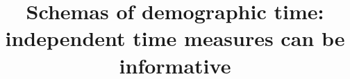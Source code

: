 \documentclass{bmcart}
\begin{document}
\begin{frontmatter}

\begin{fmbox}


\title{Schemas of demographic time:\\ independent time measures can be informative}


\author[
   addressref={aff1, aff2},                   %
   email={tim.riffe@gmail.com}   %
]{ }
\author[
   addressref={aff3, aff4},
   email={cohen@mail.rockefeller.edu}
]{ }


\address[id=aff1]{%
}
\address[id=aff2]{%
}


\end{fmbox}
\end{frontmatter}
\end{document}
